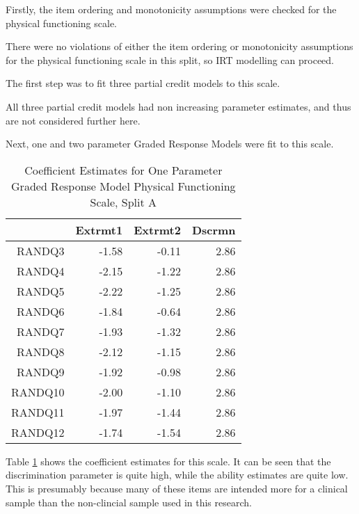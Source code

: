 \documentclass{article}
\begin{document}
Firstly, the item ordering and monotonicity assumptions were checked for the physical functioning scale. 




There were no violations of either the item ordering or monotonicity assumptions for the physical functioning scale in this split, so IRT modelling can proceed.

The first step was to fit three partial credit models to this scale.


All three partial credit models had non increasing parameter estimates, and thus are not considered further here. 

Next, one and two parameter Graded Response Models were fit to this scale. 


\begin{table}[ht]
\centering
\begin{tabular}{rrrr}
  \hline
 & Extrmt1 & Extrmt2 & Dscrmn \\ 
  \hline
RANDQ3 & -1.58 & -0.11 & 2.86 \\ 
  RANDQ4 & -2.15 & -1.22 & 2.86 \\ 
  RANDQ5 & -2.22 & -1.25 & 2.86 \\ 
  RANDQ6 & -1.84 & -0.64 & 2.86 \\ 
  RANDQ7 & -1.93 & -1.32 & 2.86 \\ 
  RANDQ8 & -2.12 & -1.15 & 2.86 \\ 
  RANDQ9 & -1.92 & -0.98 & 2.86 \\ 
  RANDQ10 & -2.00 & -1.10 & 2.86 \\ 
  RANDQ11 & -1.97 & -1.44 & 2.86 \\ 
  RANDQ12 & -1.74 & -1.54 & 2.86 \\ 
   \hline
\end{tabular}
\caption{Coefficient Estimates for One Parameter Graded Response Model Physical Functioning Scale, Split A} 
\label{tab:rand2aphysfungrm1pl}
\end{table}
Table \ref{tab:rand2aphysfungrm1pl} shows the coefficient estimates for this scale. It can be seen that the discrimination parameter is quite high, while the ability estimates are quite low. This is presumably because many of these items are intended more for a clinical sample than the non-clincial sample used in this research. 
\end{document}
